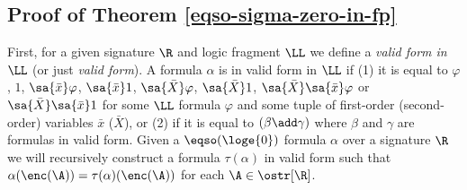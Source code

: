 \subsection*{Proof of Theorem \ref{eqso-sigma-zero-in-fp}}

First, for a given signature $\R$ and logic fragment $\LL$ we define a {\em valid form in $\LL$} (or just {\em valid form}). A formula $\alpha$ is in valid form in $\LL$ if (1) it is equal to $\varphi$, $1$, $\sa{\bar{x}}\varphi$, $\sa{\bar{x}}1$, $\sa{\bar{X}}\varphi$, $\sa{\bar{X}}1$, $\sa{\bar{X}}\sa{\bar{x}}\varphi$ or $\sa{\bar{X}}\sa{\bar{x}}1$ for some $\LL$ formula $\varphi$ and some tuple of first-order (second-order) variables $\bar{x}$ ($\bar{X}$), or (2) if it is equal to $(\beta\add\gamma)$ where $\beta$ and $\gamma$ are formulas in valid form. Given a $\eqso(\loge{0})$ formula $\alpha$ over a signature $\R$ we will recursively construct a formula $\tau(\alpha)$ in valid form such that $\alpha(\enc(\A)) = \tau(\alpha)(\enc(\A))$ for each $\A\in\ostr[\R]$. 

